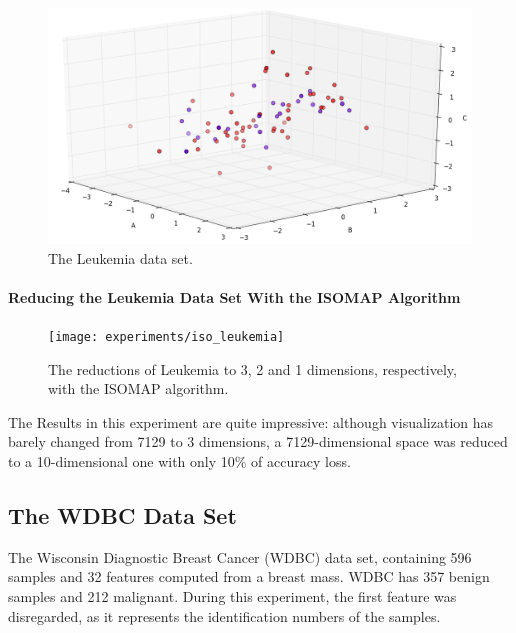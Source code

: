 \begin{figure}[H]
	\centering
	\includegraphics[width=\linewidth]{img/datasets/leukemia}
	\captionsetup{justification=centering}
	\caption{The Leukemia data set.}
\end{figure}

\newpage
\paragraph{Reducing the Leukemia Data Set With the ISOMAP Algorithm}

\begin{figure}[H]
	\centering
	\captionsetup{justification=centering}
	\texttt{[image: experiments/iso\_leukemia]}
	\caption{The reductions of Leukemia to 3, 2 and 1 dimensions, respectively, with the ISOMAP algorithm.}
	\label{fig:dsleukemiaiso}
\end{figure}

The Results in this experiment are quite impressive: although visualization has barely changed from 7129 to 3 dimensions, a 7129-dimensional space was reduced to a 10-dimensional one with only 10\% of accuracy loss.

\clearpage
\subsection{The WDBC Data Set}

The Wisconsin Diagnostic Breast Cancer (WDBC) data set, containing 596 samples and 32 features computed from a breast mass. WDBC has 357 benign samples and 212 malignant. During this experiment, the first feature was disregarded, as it represents the identification numbers of the samples.

